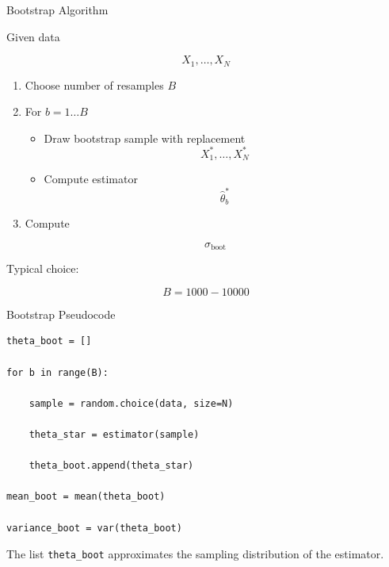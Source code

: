 \documentclass{beamer}
\begin{document}

\begin{frame}{Bootstrap Algorithm}

Given data

\[
X_1,\dots,X_N
\]

\begin{enumerate}

\item Choose number of resamples $B$

\item For $b=1\dots B$

\begin{itemize}

\item Draw bootstrap sample with replacement
\[
X_1^*,\dots,X_N^*
\]

\item Compute estimator
\[
\hat{\theta}_b^*
\]

\end{itemize}

\item Compute

\[
\sigma_{\text{boot}}
\]

\end{enumerate}

Typical choice:

\[
B = 1000 - 10000
\]
\end{frame}


\begin{frame}{Bootstrap Pseudocode}

\begin{verbatim}
theta_boot = []

for b in range(B):

    sample = random.choice(data, size=N)

    theta_star = estimator(sample)

    theta_boot.append(theta_star)

mean_boot = mean(theta_boot)

variance_boot = var(theta_boot)
\end{verbatim}

The list \texttt{theta\_boot} approximates the sampling distribution of the estimator.
\end{frame}

\end{document}
